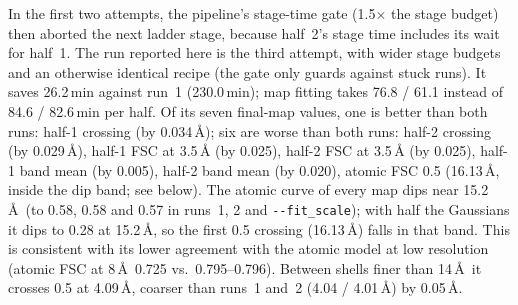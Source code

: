 In the first two attempts, the pipeline's stage-time gate (1.5$\times$ the stage budget) then aborted the next ladder stage, because half~2's stage time includes its wait for half~1. The run reported here is the third attempt, with wider stage budgets and an otherwise identical recipe (the gate only guards against stuck runs).
It saves 26.2\,min against run~1 (230.0\,min); map fitting takes 76.8 / 61.1 instead of 84.6 / 82.6\,min per half.
Of its seven final-map values, one is better than both runs: half-1 crossing (by 0.034\,\AA); six are worse than both runs: half-2 crossing (by 0.029\,\AA), half-1 FSC at 3.5\,\AA{} (by 0.025), half-2 FSC at 3.5\,\AA{} (by 0.025), half-1 band mean (by 0.005), half-2 band mean (by 0.020), atomic FSC 0.5 (16.13\,\AA, inside the dip band; see below).
The atomic curve of every map dips near 15.2\,\AA\ (to 0.58, 0.58 and 0.57 in runs~1, 2 and \texttt{-{}-fit\_scale}); with half the Gaussians it dips to 0.28 at 15.2\,\AA, so the first 0.5 crossing (16.13\,\AA) falls in that band. This is consistent with its lower agreement with the atomic model at low resolution (atomic FSC at 8\,\AA\ 0.725 vs.\ 0.795--0.796). Between shells finer than 14\,\AA\ it crosses 0.5 at 4.09\,\AA, coarser than runs~1 and~2 (4.04 / 4.01\,\AA) by 0.05\,\AA.
